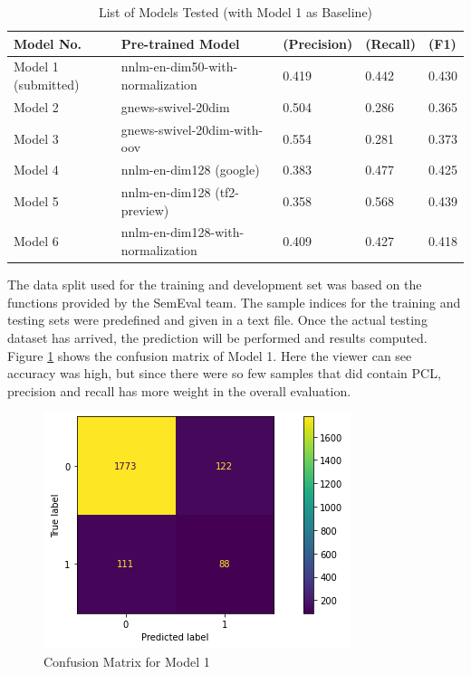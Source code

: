 \documentclass[11pt,a4paper]{article}
\begin{document}
\begin{table}
\centering
\begin{tabular}{lllll}
\hline
\textbf{Model No.} & \textbf{Pre-trained Model} & \textbf{(Precision)} & \textbf{(Recall)} & \textbf{(F1)} \\
\hline
Model 1 (submitted) & nnlm-en-dim50-with-normalization & 0.419 & 0.442 & 0.430 \\
Model 2 & gnews-swivel-20dim & 0.504 & 0.286 & 0.365 \\
Model 3 & gnews-swivel-20dim-with-oov & 0.554 & 0.281 & 0.373 \\
Model 4 & nnlm-en-dim128 (google) & 0.383 & 0.477 & 0.425 \\
Model 5 & nnlm-en-dim128 (tf2-preview) & 0.358 & 0.568 & 0.439 \\
Model 6 & nnlm-en-dim128-with-normalization & 0.409 & 0.427 & 0.418 \\
\hline
\end{tabular}
\caption{\label{models_list}
List of Models Tested (with Model 1 as Baseline)
}
\end{table}

The data split used for the training and development set was based on the functions provided by the SemEval team. The sample indices for the training and testing sets were predefined and given in a text file. Once the actual testing dataset has arrived, the prediction will be performed and results computed. Figure \ref{fig:conf_mat} shows the confusion matrix of Model 1. Here the viewer can see accuracy was high, but since there were so few samples that did contain PCL, precision and recall has more weight in the overall evaluation.

\begin{figure}[t]
\includegraphics[scale=0.5]{conf_mat.png}
\centering
\caption{Confusion Matrix for Model 1}
\label{fig:conf_mat}
\end{figure}
\end{document}
